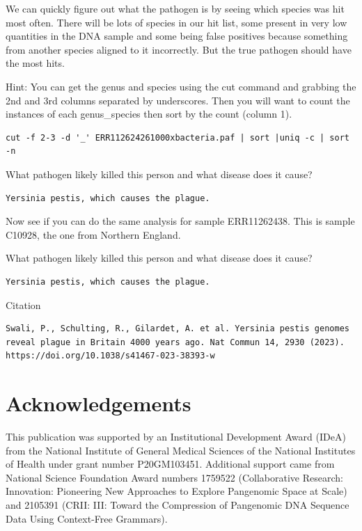 \documentclass[
]{book}
\begin{document}
We can quickly figure out what the pathogen is by seeing which species was hit most often. There will be lots of species in our hit list, some present in very low quantities in the DNA sample and some being false positives because something from another species aligned to it incorrectly. But the true pathogen should have the most hits.

Hint: You can get the genus and species using the cut command and grabbing the 2nd and 3rd columns separated by underscores. Then you will want to count the instances of each genus\_species then sort by the count (column 1).

\begin{verbatim}
cut -f 2-3 -d '_' ERR112624261000xbacteria.paf | sort |uniq -c | sort -n
\end{verbatim}

What pathogen likely killed this person and what disease does it cause?

\begin{verbatim}
Yersinia pestis, which causes the plague.
\end{verbatim}

Now see if you can do the same analysis for sample ERR11262438. This is sample C10928, the one from Northern England.

What pathogen likely killed this person and what disease does it cause?

\begin{verbatim}
Yersinia pestis, which causes the plague.
\end{verbatim}

Citation

\begin{verbatim}
Swali, P., Schulting, R., Gilardet, A. et al. Yersinia pestis genomes reveal plague in Britain 4000 years ago. Nat Commun 14, 2930 (2023). https://doi.org/10.1038/s41467-023-38393-w
\end{verbatim}

\hypertarget{acknowledgements}{%
\chapter{Acknowledgements}\label{acknowledgements}}

This publication was supported by an Institutional Development Award (IDeA) from the National Institute of General Medical Sciences of the National Institutes of Health under grant number P20GM103451. Additional support came from National Science Foundation Award numbers 1759522 (Collaborative Research: Innovation: Pioneering New Approaches to Explore Pangenomic Space at Scale) and 2105391 (CRII: III: Toward the Compression of Pangenomic DNA Sequence Data Using Context-Free Grammars).
\end{document}
